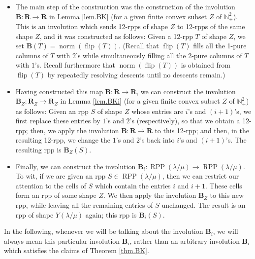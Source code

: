 \documentclass[numbers=enddot,12pt,final,onecolumn,notitlepage]{scrartcl}%
\theoremstyle{definition}
\begin{document}
\begin{itemize}
\item The main step of the construction was the construction of the involution
$\mathbf{B}:\mathbf{R}\rightarrow\mathbf{R}$ in Lemma \ref{lem.BK} (for a
given finite convex subset $Z$ of $\mathbb{N}_{+}^{2}$). This is an involution
which sends 12-rpps of shape $Z$ to 12-rpps of the same shape $Z$, and it was
constructed as follows: Given a 12-rpp $T$ of shape $Z$, we set $\mathbf{B}%
\left(  T\right)  =\operatorname*{norm}\left(  \operatorname*{flip}\left(
T\right)  \right)  $. (Recall that $\operatorname*{flip}\left(  T\right)  $
fills all the 1-pure columns of $T$ with $2$'s while simultaneously filling
all the 2-pure columns of $T$ with $1$'s. Recall furthermore that
$\operatorname*{norm}\left(  \operatorname*{flip}\left(  T\right)  \right)  $
is obtained from $\operatorname*{flip}\left(  T\right)  $ by repeatedly
resolving descents until no descents remain.)

\item Having constructed this map $\mathbf{B}:\mathbf{R}\rightarrow\mathbf{R}%
$, we can construct the involution $\mathbf{B}_{Z}:\mathbf{R}_{Z}%
\rightarrow\mathbf{R}_{Z}$ in Lemma \ref{lem.BKi} (for a given finite convex
subset $Z$ of $\mathbb{N}_{+}^{2}$) as follows: Given an rpp $S$ of shape $Z$
whose entries are $i$'s and $\left(  i+1\right)  $'s, we first replace these
entries by $1$'s and $2$'s (respectively), so that we obtain a 12-rpp; then,
we apply the involution $\mathbf{B}:\mathbf{R}\rightarrow\mathbf{R}$ to this
12-rpp; and then, in the resulting 12-rpp, we change the $1$'s and $2$'s back
into $i$'s and $\left(  i+1\right)  $'s. The resulting rpp is $\mathbf{B}%
_{Z}\left(  S\right)  $.

\item Finally, we can construct the involution $\mathbf{B}_{i}%
:\operatorname*{RPP}\left(  \lambda/\mu\right)  \rightarrow\operatorname*{RPP}%
\left(  \lambda/\mu\right)  $. To wit, if we are given an rpp $S\in
\operatorname*{RPP}\left(  \lambda/\mu\right)  $, then we can restrict our
attention to the cells of $S$ which contain the entries $i$ and $i+1$. These
cells form an rpp of some shape $Z$. We then apply the involution
$\mathbf{B}_{Z}$ to this new rpp, while leaving all the remaining entries of
$S$ unchanged. The result is an rpp of shape $Y\left(  \lambda/\mu\right)  $
again; this rpp is $\mathbf{B}_{i}\left(  S\right)  $.
\end{itemize}

In the following, whenever we will be talking about the involution
$\mathbf{B}_{i}$, we will always mean this particular involution
$\mathbf{B}_{i}$, rather than an arbitrary involution $\mathbf{B}_{i}$ which
satisfies the claims of Theorem \ref{thm.BK}.
\end{document}
